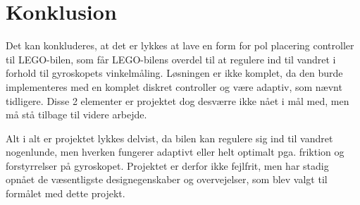 \section{Konklusion}
Det kan konkluderes, at det er lykkes at lave en form for pol placering controller til LEGO-bilen, som får LEGO-bilens overdel til at regulere ind til vandret i forhold til gyroskopets vinkelmåling. Løsningen er ikke komplet, da den burde implementeres med en komplet diskret controller og være adaptiv, som nævnt tidligere. Disse 2 elementer er projektet dog desværre ikke nået i mål med, men må stå tilbage til videre arbejde. 

Alt i alt er projektet lykkes delvist, da bilen kan regulere sig ind til vandret nogenlunde, men hverken fungerer adaptivt eller helt optimalt pga. friktion og forstyrrelser på gyroskopet. Projektet er derfor ikke fejlfrit, men har stadig opnået de væsentligste designegenskaber og overvejelser, som blev valgt til formålet med dette projekt. 


